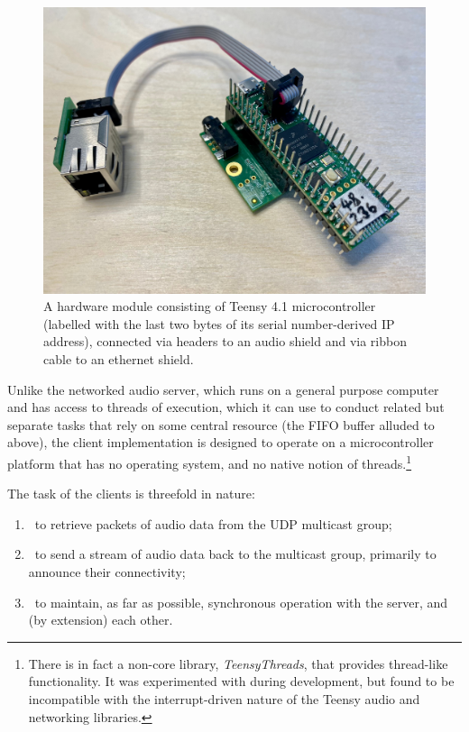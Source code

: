 \documentclass[utf8]{FrontiersinHarvard}
\begin{document}
    \begin{figure}[ht]
        \centering
        \includegraphics[width=.75\textwidth]{figures/module}
        \caption{A hardware module consisting of Teensy 4.1 microcontroller
            (labelled with the last two bytes of its serial number-derived IP address),
            connected via headers to an audio shield and via ribbon cable to an
            ethernet shield.}
        \label{fig:teensy}
    \end{figure}

    Unlike the networked audio server, which runs on a general purpose computer and
    has access to threads of execution, which it can use to conduct related but
    separate tasks that rely on some central resource (the FIFO buffer alluded to
    above), the client implementation is designed to operate on a microcontroller
    platform that has no operating system, and no native notion of threads.\footnote{
        There is in fact a non-core library, \textit{TeensyThreads}, that provides
        thread-like functionality. It was experimented with during development,
        but found to be incompatible with the interrupt-driven nature of the
        Teensy audio and networking libraries.
    }

    The task of the clients is threefold in nature:
    \begin{enumerate}
        \item~to retrieve packets of audio data from the UDP multicast group;
        \item~to send a stream of audio data back to the multicast group, primarily
        to announce their connectivity;
        \item~to maintain, as far as possible, synchronous operation with the
        server, and (by extension) each other.
    \end{enumerate}
\end{document}
